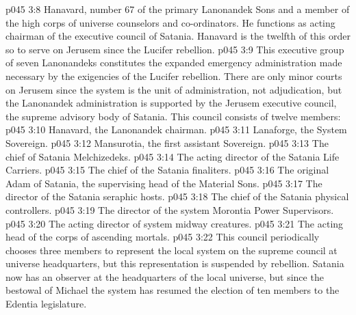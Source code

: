 \vs p045 3:8 \pc {}\bibnobreakspace {} Hanavard, number 67 of the primary Lanonandek Sons and a member of the high corps of universe counselors and co\hyp{}ordinators. He functions as acting chairman of the executive council of Satania. Hanavard is the twelfth of this order so to serve on Jerusem since the Lucifer rebellion.
\vs p045 3:9 \pc This executive group of seven Lanonandeks constitutes the expanded emergency administration made necessary by the exigencies of the Lucifer rebellion. There are only minor courts on Jerusem since the system is the unit of administration, not adjudication, but the Lanonandek administration is supported by the Jerusem executive council, the supreme advisory body of Satania. This council consists of twelve members:
\vs p045 3:10 \bibnobreakspace Hanavard, the Lanonandek chairman.
\vs p045 3:11 \bibnobreakspace Lanaforge, the System Sovereign.
\vs p045 3:12 \bibnobreakspace Mansurotia, the first assistant Sovereign.
\vs p045 3:13 \bibnobreakspace The chief of Satania Melchizedeks.
\vs p045 3:14 \bibnobreakspace The acting director of the Satania Life Carriers.
\vs p045 3:15 \bibnobreakspace The chief of the Satania finaliters.
\vs p045 3:16 \bibnobreakspace The original Adam of Satania, the supervising head of the Material Sons.
\vs p045 3:17 \bibnobreakspace The director of the Satania seraphic hosts.
\vs p045 3:18 \bibnobreakspace The chief of the Satania physical controllers.
\vs p045 3:19 \bibnobreakspace The director of the system Morontia Power Supervisors.
\vs p045 3:20 \bibnobreakspace The acting director of system midway creatures.
\vs p045 3:21 \bibnobreakspace The acting head of the corps of ascending mortals.
\vs p045 3:22 \pc This council periodically chooses three members to represent the local system on the supreme council at universe headquarters, but this representation is suspended by rebellion. Satania now has an observer at the headquarters of the local universe, but since the bestowal of Michael the system has resumed the election of ten members to the Edentia legislature.
